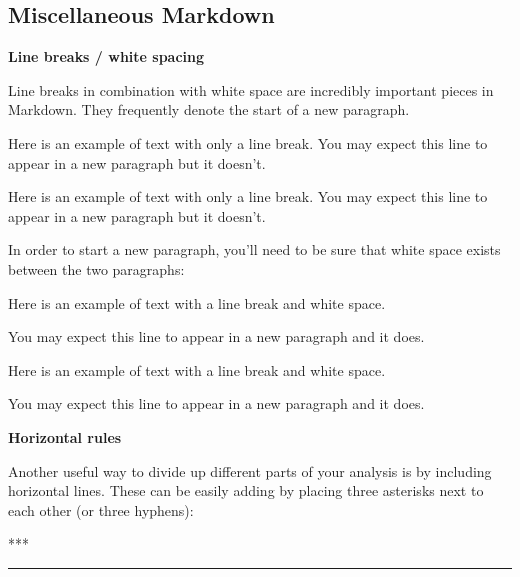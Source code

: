 \documentclass[]{tufte-book}
\newenvironment{Shaded}{\begin{snugshade}}{\end{snugshade}}
\newcommand{\NormalTok}[1]{{#1}}
\begin{document}
\subsection{Miscellaneous Markdown}\label{miscellaneous-markdown}

\textbf{Line breaks / white spacing}

Line breaks in combination with white space are incredibly important
pieces in Markdown. They frequently denote the start of a new paragraph.

\begin{Shaded}
\begin{Highlighting}[]
\NormalTok{Here is an example of text with only a line break.}
\NormalTok{You may expect this line to appear in a new paragraph but it doesn't.}
\end{Highlighting}
\end{Shaded}

Here is an example of text with only a line break. You may expect this
line to appear in a new paragraph but it doesn't.

In order to start a new paragraph, you'll need to be sure that white
space exists between the two paragraphs:

\begin{Shaded}
\begin{Highlighting}[]
\NormalTok{Here is an example of text with a line break and white space.}

\NormalTok{You may expect this line to appear in a new paragraph and it does.}
\end{Highlighting}
\end{Shaded}

Here is an example of text with a line break and white space.

You may expect this line to appear in a new paragraph and it does.

\textbf{Horizontal rules}

Another useful way to divide up different parts of your analysis is by
including horizontal lines. These can be easily adding by placing three
asterisks next to each other (or three hyphens):

\begin{Shaded}
\begin{Highlighting}[]
\NormalTok{***}
\end{Highlighting}
\end{Shaded}

\begin{center}\rule{0.5\linewidth}{\linethickness}\end{center}
\end{document}
